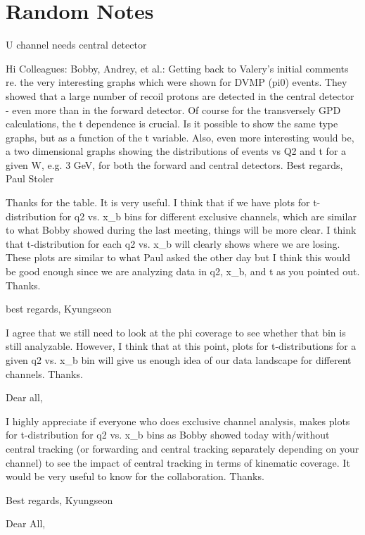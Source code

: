 \section{Random Notes}
U channel needs central detector

Hi Colleagues: Bobby, Andrey,  et al.:
Getting back to Valery’s initial comments re. the very interesting graphs which were shown for DVMP (pi0) events. They  showed that a large number of  recoil protons are detected in the central detector - even more than in the forward detector. Of course for the transversely GPD calculations, the t dependence is crucial.  Is it possible to show the same type graphs, but as a function of the t variable. Also, even more interesting would be, a two dimensional graphs  showing the distributions of events vs Q2 and t  for a given W, e.g. 3 GeV, for both the forward and central detectors.
Best regards,
Paul Stoler

Thanks for the table.  It is very useful.  I think that if we have plots for t-distribution for q2 vs. x_b bins for different exclusive channels, which are similar to what Bobby showed during the last meeting, things will be more clear.      I think that  t-distribution for each q2 vs. x_b will clearly shows where we are losing.  These plots are similar to what Paul asked the other day but I think this would be good enough since we are analyzing data in q2, x_b, and t as you pointed out.   Thanks.

best regards, Kyungseon

I agree that we still need to look at the phi coverage to see whether that bin is still analyzable.  However, I think that at this point, plots for t-distributions for a given q2 vs. x_b bin will give us enough idea of our data landscape for different channels.  Thanks.


Dear all,

I highly appreciate if everyone who does exclusive channel analysis, makes plots for t-distribution for q2 vs. x_b bins as Bobby showed today with/without central tracking (or forwarding and central tracking separately depending on your channel) to see the impact of central tracking in terms of kinematic coverage.  It would be very useful to know for the collaboration.   Thanks.

Best regards, Kyungseon


Dear All,

